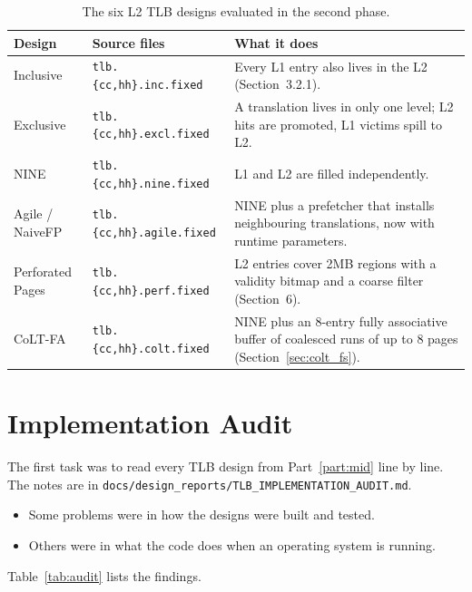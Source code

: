 \begin{table}[htbp]
\centering
\small
\caption{The six L2 TLB designs evaluated in the second phase.}
\label{tab:designs}
\begin{tabularx}{\textwidth}{l l X}
\toprule
\textbf{Design} & \textbf{Source files} & \textbf{What it does} \\
\midrule
Inclusive & \texttt{tlb.\{cc,hh\}.inc.fixed} & Every L1 entry also lives in the L2 (Section~3.2.1). \\
Exclusive & \texttt{tlb.\{cc,hh\}.excl.fixed} & A translation lives in only one level; L2 hits are promoted, L1 victims spill to L2. \\
NINE & \texttt{tlb.\{cc,hh\}.nine.fixed} & L1 and L2 are filled independently. \\
Agile / NaiveFP & \texttt{tlb.\{cc,hh\}.agile.fixed} & NINE plus a prefetcher that installs neighbouring translations, now with runtime parameters. \\
Perforated Pages & \texttt{tlb.\{cc,hh\}.perf.fixed} & L2 entries cover 2MB regions with a validity bitmap and a coarse filter (Section~6). \\
CoLT-FA & \texttt{tlb.\{cc,hh\}.colt.fixed} & NINE plus an 8-entry fully associative buffer of coalesced runs of up to 8 pages (Section~\ref{sec:colt_fs}). \\
\bottomrule
\end{tabularx}
\end{table}

\section{Implementation Audit}
\label{sec:audit}

The first task was to read every TLB design from Part~\ref{part:mid} line by line. The notes are in \texttt{docs/design\_reports/TLB\_IMPLEMENTATION\_AUDIT.md}.
\begin{itemize}
    \item Some problems were in how the designs were built and tested.
    \item Others were in what the code does when an operating system is running.
\end{itemize}
Table~\ref{tab:audit} lists the findings.


